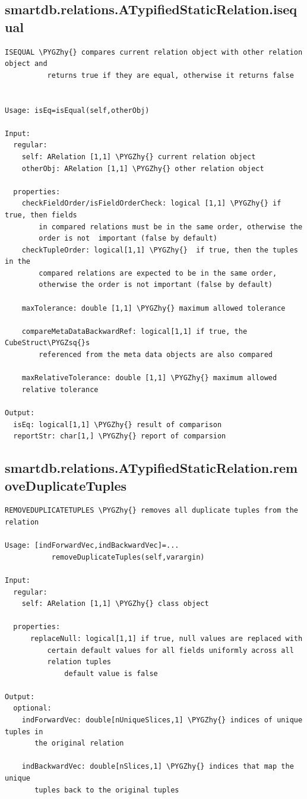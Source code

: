 \documentclass[letterpaper,10pt,english]{sphinxmanual}
\def\PYGZhy{\char`\-}
\def\PYGZsq{\char`\'}
\begin{document}
\subsection{smartdb.relations.ATypifiedStaticRelation.isequal}
\label{chap_functions:id1}
\begin{Verbatim}[commandchars=\\\{\}]
ISEQUAL \PYGZhy{} compares current relation object with other relation object and
          returns true if they are equal, otherwise it returns false


Usage: isEq=isEqual(self,otherObj)

Input:
  regular:
    self: ARelation [1,1] \PYGZhy{} current relation object
    otherObj: ARelation [1,1] \PYGZhy{} other relation object

  properties:
    checkFieldOrder/isFieldOrderCheck: logical [1,1] \PYGZhy{} if true, then fields
        in compared relations must be in the same order, otherwise the
        order is not  important (false by default)
    checkTupleOrder: logical[1,1] \PYGZhy{}  if true, then the tuples in the
        compared relations are expected to be in the same order,
        otherwise the order is not important (false by default)

    maxTolerance: double [1,1] \PYGZhy{} maximum allowed tolerance

    compareMetaDataBackwardRef: logical[1,1] if true, the CubeStruct\PYGZsq{}s
        referenced from the meta data objects are also compared

    maxRelativeTolerance: double [1,1] \PYGZhy{} maximum allowed
    relative tolerance

Output:
  isEq: logical[1,1] \PYGZhy{} result of comparison
  reportStr: char[1,] \PYGZhy{} report of comparsion
\end{Verbatim}


\subsection{smartdb.relations.ATypifiedStaticRelation.removeDuplicateTuples}
\label{chap_functions:smartdb-relations-atypifiedstaticrelation-removeduplicatetuples}
\begin{Verbatim}[commandchars=\\\{\}]
REMOVEDUPLICATETUPLES \PYGZhy{} removes all duplicate tuples from the relation

Usage: [indForwardVec,indBackwardVec]=...
           removeDuplicateTuples(self,varargin)

Input:
  regular:
    self: ARelation [1,1] \PYGZhy{} class object

  properties:
      replaceNull: logical[1,1] if true, null values are replaced with
          certain default values for all fields uniformly across all
          relation tuples
              default value is false

Output:
  optional:
    indForwardVec: double[nUniqueSlices,1] \PYGZhy{} indices of unique tuples in
       the original relation

    indBackwardVec: double[nSlices,1] \PYGZhy{} indices that map the unique
       tuples back to the original tuples
\end{Verbatim}
\end{document}
